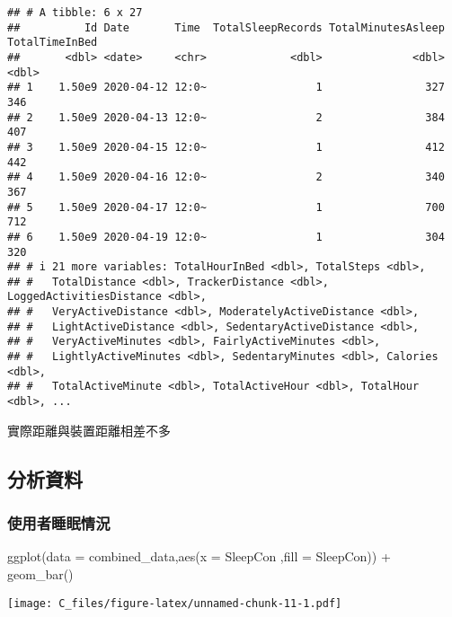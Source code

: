 \documentclass[
]{article}
\newenvironment{Shaded}{\begin{snugshade}}{\end{snugshade}}
\newcommand{\AttributeTok}[1]{\textcolor[rgb]{0.77,0.63,0.00}{#1}}
\newcommand{\FunctionTok}[1]{\textcolor[rgb]{0.00,0.00,0.00}{#1}}
\newcommand{\NormalTok}[1]{#1}
\newcommand{\SpecialCharTok}[1]{\textcolor[rgb]{0.00,0.00,0.00}{#1}}
\begin{document}
\begin{verbatim}
## # A tibble: 6 x 27
##          Id Date       Time  TotalSleepRecords TotalMinutesAsleep TotalTimeInBed
##       <dbl> <date>     <chr>             <dbl>              <dbl>          <dbl>
## 1    1.50e9 2020-04-12 12:0~                 1                327            346
## 2    1.50e9 2020-04-13 12:0~                 2                384            407
## 3    1.50e9 2020-04-15 12:0~                 1                412            442
## 4    1.50e9 2020-04-16 12:0~                 2                340            367
## 5    1.50e9 2020-04-17 12:0~                 1                700            712
## 6    1.50e9 2020-04-19 12:0~                 1                304            320
## # i 21 more variables: TotalHourInBed <dbl>, TotalSteps <dbl>,
## #   TotalDistance <dbl>, TrackerDistance <dbl>, LoggedActivitiesDistance <dbl>,
## #   VeryActiveDistance <dbl>, ModeratelyActiveDistance <dbl>,
## #   LightActiveDistance <dbl>, SedentaryActiveDistance <dbl>,
## #   VeryActiveMinutes <dbl>, FairlyActiveMinutes <dbl>,
## #   LightlyActiveMinutes <dbl>, SedentaryMinutes <dbl>, Calories <dbl>,
## #   TotalActiveMinute <dbl>, TotalActiveHour <dbl>, TotalHour <dbl>, ...
\end{verbatim}

實際距離與裝置距離相差不多

\hypertarget{ux5206ux6790ux8cc7ux6599}{%
\subsection{分析資料}\label{ux5206ux6790ux8cc7ux6599}}

\hypertarget{ux4f7fux7528ux8005ux7761ux7720ux60c5ux6cc1}{%
\subsubsection{使用者睡眠情況}\label{ux4f7fux7528ux8005ux7761ux7720ux60c5ux6cc1}}

\begin{Shaded}
\begin{Highlighting}[]
\FunctionTok{ggplot}\NormalTok{(}\AttributeTok{data =}\NormalTok{ combined\_data,}\FunctionTok{aes}\NormalTok{(}\AttributeTok{x =}\NormalTok{ SleepCon ,}\AttributeTok{fill =}\NormalTok{ SleepCon)) }\SpecialCharTok{+} 
  \FunctionTok{geom\_bar}\NormalTok{() }
\end{Highlighting}
\end{Shaded}

\texttt{[image: C\_files/figure-latex/unnamed-chunk-11-1.pdf]}
\end{document}
